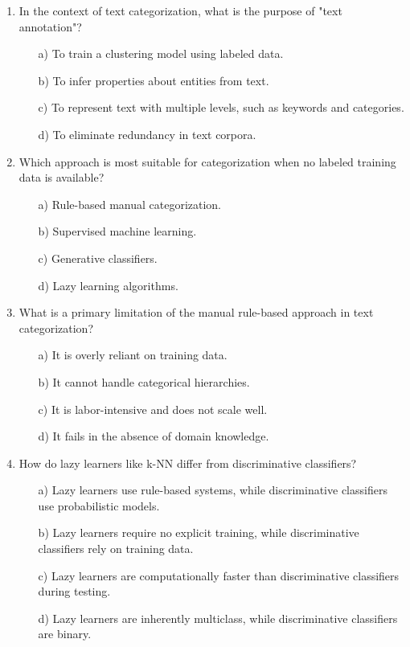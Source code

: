\documentclass[8pt]{extarticle}
\begin{document}
\begin{multicols}{2}
\begin{enumerate}
\item In the context of text categorization, what is the purpose of "text annotation"?
\begin{itemize}
\item[a)] To train a clustering model using labeled data.
\item[b)] To infer properties about entities from text.
\item[c)] To represent text with multiple levels, such as keywords and categories.
\item[d)] To eliminate redundancy in text corpora.
\end{itemize}

\item Which approach is most suitable for categorization when no labeled training data is available?
\begin{itemize}
\item[a)] Rule-based manual categorization.
\item[b)] Supervised machine learning.
\item[c)] Generative classifiers.
\item[d)] Lazy learning algorithms.
\end{itemize}


\item What is a primary limitation of the manual rule-based approach in text categorization?
\begin{itemize}
\item[a)] It is overly reliant on training data.
\item[b)] It cannot handle categorical hierarchies.
\item[c)] It is labor-intensive and does not scale well.
\item[d)] It fails in the absence of domain knowledge.
\end{itemize}


\item How do lazy learners like k-NN differ from discriminative classifiers?
\begin{itemize}
\item[a)] Lazy learners use rule-based systems, while discriminative classifiers use probabilistic models.
\item[b)] Lazy learners require no explicit training, while discriminative classifiers rely on training data.
\item[c)] Lazy learners are computationally faster than discriminative classifiers during testing.
\item[d)] Lazy learners are inherently multiclass, while discriminative classifiers are binary.
\end{itemize}



\end{enumerate}
\end{multicols}
\end{document}

